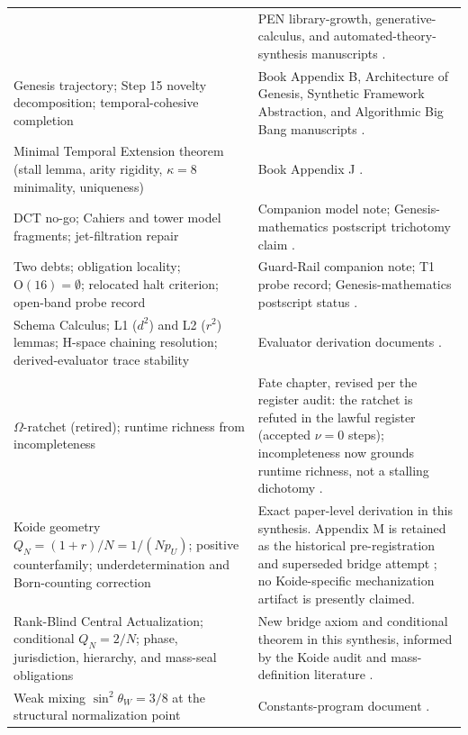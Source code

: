 \documentclass[11pt]{article}
\theoremstyle{plain}
\theoremstyle{definition}
\theoremstyle{remark}
\begin{document}
\begin{longtable}{@{}>{\raggedright\arraybackslash}p{}>{\raggedright\arraybackslash}p{}@{}}
& PEN library-growth, generative-calculus, and automated-theory-synthesis manuscripts \cite{lande-pen,lande-generative,lande-automated}. \\
Genesis trajectory; Step 15 novelty decomposition; temporal-cohesive completion
& Book Appendix B, Architecture of Genesis, Synthetic Framework Abstraction, and Algorithmic Big Bang manuscripts \cite{lande-book-appendices,lande-architecture,lande-synthetic,lande-bigbang}. \\
Minimal Temporal Extension theorem (stall lemma, arity rigidity, \(\kappa=8\) minimality, uniqueness)
& Book Appendix J \cite{lande-minimal-extension}. \\
DCT no-go; Cahiers and tower model fragments; jet-filtration repair
& Companion model note; Genesis-mathematics postscript trichotomy claim \cite{lande-dct-note,lande-book-appendices}. \\
Two debts; obligation locality; \(\mathrm{O}(16)=\emptyset\); relocated halt criterion; open-band probe record
& Guard-Rail companion note; T1 probe record; Genesis-mathematics postscript status \cite{lande-guard-rail,lande-book-appendices}. \\
Schema Calculus; L1 (\(d^2\)) and L2 (\(r^2\)) lemmas; H-space chaining resolution; derived-evaluator trace stability
& Evaluator derivation documents \cite{lande-evaluator}. \\
\(\Omega\)-ratchet (retired); runtime richness from incompleteness
& Fate chapter, revised per the register audit: the ratchet is refuted in the lawful register (accepted \(\nu=0\) steps); incompleteness now grounds runtime richness, not a stalling dichotomy \cite{lande-fate}. \\
Koide geometry \(Q_N=(1+r)/N=1/(Np_U)\); positive counterfamily; underdetermination and Born-counting correction
& Exact paper-level derivation in this synthesis. Appendix M is retained as the historical pre-registration and superseded bridge attempt \cite{lande-koide}; no Koide-specific mechanization artifact is presently claimed. \\
Rank-Blind Central Actualization; conditional \(Q_N=2/N\); phase, jurisdiction, hierarchy, and mass-seal obligations
& New bridge axiom and conditional theorem in this synthesis, informed by the Koide audit and mass-definition literature \cite{lande-koide,xing-koide,sumino-koide,weldon-shell,kniehl-sirlin}. \\
Weak mixing \(\sin^2\theta_W=3/8\) at the structural normalization point
& Constants-program document \cite{lande-constants}. \\

\end{longtable}
\end{document}
